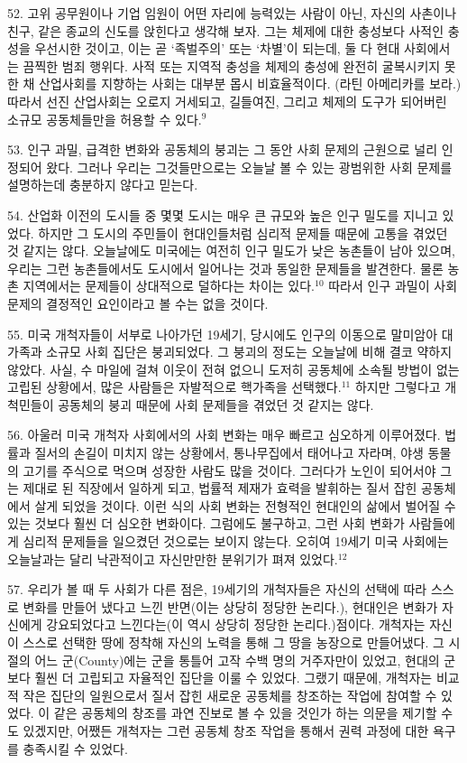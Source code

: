 \documentclass[11pt,a4paper]{article}
\begin{document}
\begin{multicols}{2}
52. 고위 공무원이나 기업 임원이 어떤 자리에 능력있는 사람이 아닌, 자신의 사촌이나 친구, 같은 종교의 신도를 앉힌다고 생각해 보자. 그는 체제에 대한 충성보다 사적인 충성을 우선시한 것이고, 이는 곧 `족벌주의' 또는 `차별'이 되는데, 둘 다 현대 사회에서는 끔찍한 범죄 행위다. 사적 또는 지역적 충성을  체제의 충성에 완전히 굴복시키지 못한 채 산업사회를 지향하는 사회는 대부분 몹시 비효율적이다. (라틴 아메리카를 보라.) 따라서 선진 산업사회는 오로지 거세되고, 길들여진, 그리고 체제의 도구가 되어버린 소규모 공동체들만을 허용할 수 있다.\hyperlink{9}{$^{9}$} 


53. 인구 과밀, 급격한 변화와 공동체의 붕괴는 그 동안 사회 문제의 근원으로 널리 인정되어 왔다.  그러나 우리는 그것들만으로는 오늘날 볼 수 있는 광범위한 사회 문제를 설명하는데 충분하지 않다고  믿는다. 


54. 산업화 이전의 도시들 중 몇몇 도시는 매우 큰 규모와 높은 인구 밀도를 지니고 있었다. 하지만 그  도시의 주민들이 현대인들처럼 심리적 문제들 때문에 고통을 겪었던 것 같지는 않다. 오늘날에도  미국에는 여전히 인구 밀도가 낮은 농촌들이 남아 있으며, 우리는 그런 농촌들에서도 도시에서 일어나는  것과 동일한 문제들을 발견한다. 물론 농촌 지역에서는 문제들이 상대적으로 덜하다는 차이는 있다.\hyperlink{10}{$^{10}$} 따라서 인구 과밀이 사회 문제의 결정적인 요인이라고 볼 수는 없을 것이다. 


55. 미국 개척자들이 서부로 나아가던 19세기, 당시에도 인구의 이동으로 말미암아 대가족과 소규모  사회 집단은 붕괴되었다. 그 붕괴의 정도는 오늘날에 비해 결코 약하지 않았다. 사실, 수 마일에 걸쳐  이웃이 전혀 없으니 도저히 공동체에 소속될 방법이 없는 고립된 상황에서, 많은 사람들은 자발적으로  핵가족을 선택했다.\hyperlink{11}{$^{11}$} 하지만 그렇다고 개척민들이 공동체의 붕괴 때문에 사회 문제들을 겪었던 것  같지는 않다. 


56. 아울러 미국 개척자 사회에서의 사회 변화는 매우 빠르고 심오하게 이루어졌다. 법률과 질서의  손길이 미치지 않는 상황에서, 통나무집에서 태어나고 자라며, 야생 동물의 고기를 주식으로 먹으며  성장한 사람도 많을 것이다. 그러다가 노인이 되어서야 그는 제대로 된 직장에서 일하게 되고, 법률적  제재가 효력을 발휘하는 질서 잡힌 공동체에서 살게 되었을 것이다. 이런 식의 사회 변화는 전형적인  현대인의 삶에서 벌어질 수 있는 것보다 훨씬 더 심오한 변화이다. 그럼에도 불구하고, 그런 사회 변화가 
사람들에게 심리적 문제들을 일으켰던 것으로는 보이지 않는다. 오히여 19세기 미국 사회에는  오늘날과는 달리 낙관적이고 자신만만한 분위기가 펴져 있었다.\hyperlink{12}{$^{12}$}


57. 우리가 볼 때 두 사회가 다른 점은, 19세기의 개척자들은 자신의 선택에 따라 스스로 변화를 만들어  냈다고 느낀 반면(이는 상당히 정당한 논리다.), 현대인은 변화가 자신에게 강요되었다고 느낀다는(이  역시 상당히 정당한 논리다.)점이다. 개척자는 자신이 스스로 선택한 땅에 정착해 자신의 노력을 통해 그  땅을 농장으로 만들어냈다. 그 시절의 어느 군(County)에는 군을 통틀어 고작 수백 명의 거주자만이  있었고, 현대의 군보다 훨씬 더 고립되고 자율적인 집단을 이룰 수 있었다. 그랬기 때문에, 개척자는  비교적 작은 집단의 일원으로서 질서 잡힌 새로운 공동체를 창조하는 작업에 참여할 수 있었다. 이 같은  공동체의 창조를 과연 진보로 볼 수 있을 것인가 하는 의문을 제기할 수도 있겠지만, 어쨌든 개척자는  그런 공동체 창조 작업을 통해서 권력 과정에 대한 욕구를 충족시킬 수 있었다. 



\end{multicols}
\end{document}
